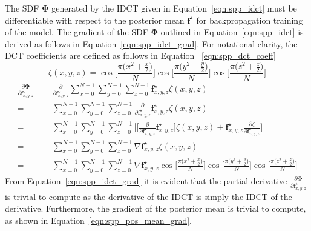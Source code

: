 The SDF \( \bm{\Phi} \) generated by the IDCT given in Equation~\ref{eqn:spp_idct} must be 
differentiable with respect to the posterior mean \( \bm{f}^{\star} \) for backpropagation 
training of the model. The gradient of the SDF \( \bm{\Phi} \) outlined in 
Equation~\ref{eqn:spp_idct} is derived as follows in Equation~\ref{eqn:spp_idct_grad}. 
For notational clarity, the DCT coefficients are defined as follows in Equation
~\ref{eqn:spp_dct_coeff}
\begin{equation}
  \label{eqn:spp_dct_coeff}
  \zeta(x, y, z) = 
  \cos \Big[ \frac{\pi \big( x^{2} + \frac{x}{2} \big)}{N} \Big]
  \cos \Big[ \frac{\pi \big( y^{2} + \frac{y}{2} \big)}{N} \Big]
  \cos \Big[ \frac{\pi \big( z^{2} + \frac{z}{2} \big)}{N} \Big]
\end{equation}
\begin{align}
  \label{eqn:spp_idct_grad}
  \frac{\partial \bm{\Phi}}{\partial \bm{f}_{x, y, z}^{\star}} ={}&
  \frac{\partial}{\partial \bm{f}_{x, y, z}^{\star}}
  \sum_{x=0}^{N-1} \sum_{y=0}^{N-1} \sum_{z=0}^{N-1} 
  \bm{f}^{\star}_{x, y, z} \zeta(x, y, z)\\
  ={}& \sum_{x=0}^{N-1} \sum_{y=0}^{N-1} \sum_{z=0}^{N-1} 
  \frac{\partial}{\partial \bm{f}_{x, y, z}^{\star}} \bm{f}^{\star}_{x, y, z}
  \zeta(x, y, z)\\
  ={}& \sum_{x=0}^{N-1} \sum_{y=0}^{N-1} \sum_{z=0}^{N-1} \Bigg[
    \Bigg[ 
      \frac{\partial}{\partial \bm{f}_{x, y, z}^{\star}} \bm{f}^{\star}_{x, y, z} 
    \Bigg] \zeta(x, y, z)
    + \bm{f}_{x, y, z}^{\star} \frac{\partial \zeta}{\partial \bm{f}_{x, y, z}^{\star}}
  \Bigg]\\
  ={}& \sum_{x=0}^{N-1} \sum_{y=0}^{N-1} \sum_{z=0}^{N-1}
  \nabla \bm{f}_{x, y, z}^{\star} \zeta(x, y, z)\\
  ={}& \sum_{x=0}^{N-1} \sum_{y=0}^{N-1} \sum_{z=0}^{N-1} 
  \nabla \bm{f}^{\star}_{x, y, z}
  \cos \Big[ \frac{\pi \big( x^{2} + \frac{x}{2} \big)}{N} \Big]
  \cos \Big[ \frac{\pi \big( y^{2} + \frac{y}{2} \big)}{N} \Big]
  \cos \Big[ \frac{\pi \big( z^{2} + \frac{z}{2} \big)}{N} \Big]
\end{align}
From Equation~\ref{eqn:spp_idct_grad} it is evident that the partial derivative 
\( \frac{\partial \bm{\Phi}}{\partial \bm{f}_{x, y, z}^{\star}} \) is trivial 
to compute as the derivative of the IDCT is simply the IDCT of the derivative. 
Furthermore, the gradient of the posterior mean is trivial to compute, as shown 
in Equation~\ref{eqn:spp_pos_mean_grad}.

